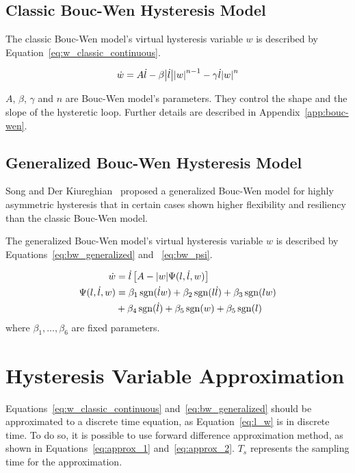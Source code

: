 \subsection{Classic Bouc-Wen Hysteresis Model}
The classic Bouc-Wen model's virtual hysteresis variable $w$ is described by Equation~\ref{eq:w_classic_continuous}.

\begin{align}
\dot{w} = A\dot{l} - \beta \abs{\dot{l}} \abs{w}^{n-1} - \gamma \dot{l} \abs{w}^n
\label{eq:w_classic_continuous}
\end{align}

$A$, $\beta$, $\gamma$ and $n$ are Bouc-Wen model's parameters.
They control the shape and the slope of the hysteretic loop.
Further details are described in Appendix~\ref{app:bouc-wen}.

\subsection{Generalized Bouc-Wen Hysteresis Model}
Song and Der Kiureghian~\cite{song2006generalized} proposed a generalized Bouc-Wen model for highly asymmetric
hysteresis that in certain cases shown higher flexibility
and resiliency than the classic Bouc-Wen model.

The generalized Bouc-Wen model's virtual hysteresis variable $w$
is described by Equations~\ref{eq:bw_generalized} and ~\ref{eq:bw_psi}.


\begin{align}
\dot{w} &= \dot{l} \left[A - \abs{w} \Psi(l, \dot{l}, w)\right] \label{eq:bw_generalized}\\
\Psi(l, \dot{l}, w) &= \beta_1 \operatorname{sgn}(\dot{l}w) + \beta_2 \operatorname{sgn}(l\dot{l}) + \beta_3 \operatorname{sgn}(lw) \nonumber \\
&+ \beta_4 \operatorname{sgn}(\dot{l}) + \beta_5 \operatorname{sgn}(w) + \beta_5 \operatorname{sgn}(l) \label{eq:bw_psi}
\end{align}
where $\beta_1,\ldots,\beta_6$ are fixed parameters.
\section{Hysteresis Variable Approximation}
Equations~\ref{eq:w_classic_continuous} and~\ref{eq:bw_generalized} should be approximated to a discrete time equation, as Equation~\ref{eq:l_w} is in discrete time. To do so, it is possible to use forward
difference approximation method, as shown in Equations~\ref{eq:approx_1} and~\ref{eq:approx_2}. $T_s$ represents the sampling time for the approximation.

